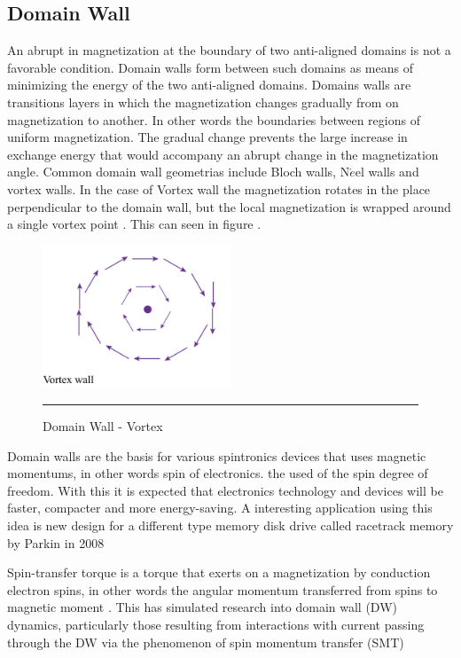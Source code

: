 \cite{ferro}

\subsection{Domain Wall}

An abrupt in magnetization at the boundary of two anti-aligned domains is not a favorable condition. Domain walls form between such domains as means of minimizing the energy of the two anti-aligned domains. Domains walls are transitions layers in which the magnetization changes gradually from on magnetization to another. In other words the boundaries between regions of uniform magnetization.  The gradual change prevents the large increase in exchange energy that would accompany an abrupt change in the magnetization angle. Common domain wall geometrias include Bloch walls, N$\acute{e}$el walls and vortex walls. In the case of Vortex wall the magnetization rotates in the place perpendicular to the domain wall, but the local magnetization is wrapped around a single vortex point \cite{spindomain}. This can seen in figure \label{eq:kg4}.

\begin{figure}[htbp]
	\centering
		\includegraphics[width=0.5\textwidth]{Figures/vortex.png}
		\rule{35em}{0.5pt}
	\caption[Domain Wall - Vortex]{Domain Wall - Vortex}
	\label{fig:vortex}
\end{figure}

Domain walls are the basis for various spintronics devices that uses magnetic momentums, in other words spin of electronics. the used of the spin degree of freedom. With this it is expected that electronics technology and devices will be faster, compacter and more energy-saving. A interesting application using this idea is new design for a different type memory disk drive called racetrack memory by Parkin in 2008\cite{racetrack}

Spin-transfer torque is a torque that exerts on a magnetization by conduction electron spins, in other words the angular momentum transferred from spins to magnetic  moment \cite{zhang}.
This has simulated research into domain wall (DW) dynamics, particularly those resulting from interactions with current passing through the DW via the phenomenon of spin momentum transfer (SMT) \cite{handbookspin}

